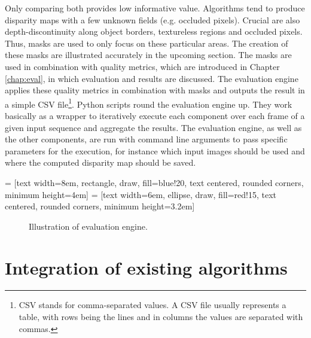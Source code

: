 Only comparing both provides low informative value.
Algorithms tend to produce disparity maps with a few unknown fields (e.g. occluded pixels).
Crucial are also depth-discontinuity along object borders, textureless regions and occluded pixels.
Thus, masks are used to only focus on these particular areas.
The creation of these masks are illustrated accurately in the upcoming section.
The masks are used in combination with quality metrics, which are introduced in Chapter \ref{chap:eval}, in which evaluation and results are discussed.
The evaluation engine applies these quality metrics in combination with masks and outputs the result in a simple CSV file\footnote{CSV stands for comma-separated values. A CSV file usually represents a table, with rows being the lines and in columns the values are separated with commas.}.
\newline\newline\noindent Python scripts round the evaluation engine up.
They work basically as a wrapper to iteratively execute each component over each frame of a given input sequence and aggregate the results.
The evaluation engine, as well as the other components, are run with command line arguments to pass specific parameters for the execution, for instance which input images should be used and where the computed disparity map should be saved.

 = [text width=8em, rectangle, draw, fill=blue!20, text centered, rounded corners, minimum height=4em]
 = [text width=6em, ellipse, draw, fill=red!15, text centered, rounded corners, minimum height=3.2em]
\begin{figure}[hp!]
  \centering
  \caption{Illustration of evaluation engine.}
  \label{fig:impl-evaluation-engine}
\end{figure}

\section{Integration of existing algorithms}

